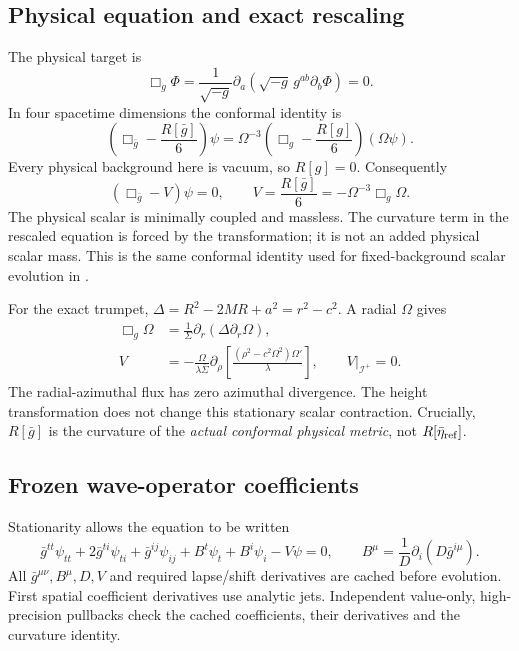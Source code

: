 \documentclass[11pt,letterpaper]{article}
\newcommand{\scri}{\mathscr{I}^{+}}
\newcommand{\G}{\bar g}
\begin{document}
\subsection{Physical equation and exact rescaling}
The physical target is
\begin{equation}\label{eq:physical}
 \Box_g\Phi=\frac{1}{\sqrt{-g}}\partial_a\!\left(\sqrt{-g}\,g^{ab}\partial_b\Phi\right)=0.
\end{equation}
In four spacetime dimensions the conformal identity is
\begin{equation}\label{eq:confid}
 \left(\Box_{\G}-\frac{R[\G]}{6}\right)\psi
 =\Omega^{-3}\left(\Box_g-\frac{R[g]}{6}\right)(\Omega\psi).
\end{equation}
Every physical background here is vacuum, so $R[g]=0$. Consequently
\begin{equation}\label{eq:conformal}
 (\Box_{\G}-V)\psi=0,\qquad
 V=\frac{R[\G]}6=-\Omega^{-3}\Box_g\Omega.
\end{equation}
The physical scalar is minimally coupled and massless. The curvature term in the rescaled equation is forced by the transformation; it is not an added physical scalar mass. This is the same conformal identity used for fixed-background scalar evolution in \cite{matching}.

For the exact trumpet, $\Delta=R^2-2MR+a^2=r^2-c^2$. A radial $\Omega$ gives
\begin{align}
 \Box_g\Omega&=\frac1\Sigma\partial_r(\Delta\partial_r\Omega),\\
 V&=-\frac{\Omega}{\lambda\bar\Sigma}\partial_\rho
 \left[\frac{(\rho^2-c^2\Omega^2)\Omega'}{\lambda}\right],
 \qquad V|_{\scri}=0.
\end{align}
The radial-azimuthal flux has zero azimuthal divergence. The height transformation does not change this stationary scalar contraction. Crucially, $R[\G]$ is the curvature of the \emph{actual conformal physical metric}, not $R[\bar\eta_{\rm ref}]$.

\subsection{Frozen wave-operator coefficients}
Stationarity allows the equation to be written
\begin{equation}\label{eq:expanded}
 \G^{tt}\psi_{tt}+2\G^{ti}\psi_{ti}+\G^{ij}\psi_{ij}
 +B^t\psi_t+B^i\psi_i-V\psi=0,\qquad
 B^\mu=\frac1D\partial_i(D\G^{i\mu}).
\end{equation}
All $\G^{\mu\nu},B^\mu,D,V$ and required lapse/shift derivatives are cached before evolution. First spatial coefficient derivatives use analytic jets. Independent value-only, high-precision pullbacks check the cached coefficients, their derivatives and the curvature identity.
\end{document}
